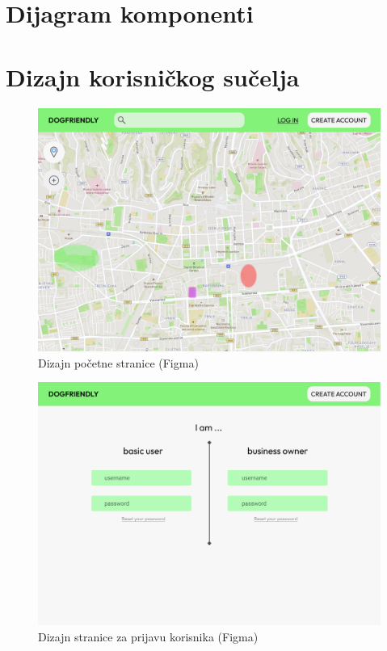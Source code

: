     \section{Dijagram komponenti}

    \pagebreak
    \section{Dizajn korisničkog sučelja}
                \begin{figure}[H]
                        \centering
                        \includegraphics[width=\textwidth]{img/pocetna_stranica.png}
                        \caption{Dizajn početne stranice (Figma)}
                \end{figure}
                \begin{figure}[H]
                        \centering
                        \includegraphics[width=\textwidth]{img/prijava.png}
                        \caption{Dizajn stranice za prijavu korisnika (Figma)}
                \end{figure}
    
